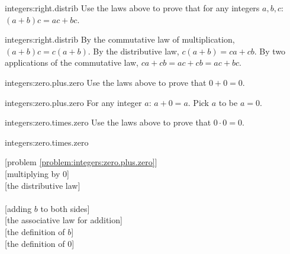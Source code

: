 \begin{problem}{integers:right.distrib}
Use the laws above to prove that for any integers \(a, b, c\): \((a+b)c=ac+bc\).
\end{problem}
\begin{answer}{integers:right.distrib}
By the commutative law of multiplication, \((a+b)c=c(a+b)\).
By the distributive law, \(c(a+b)=ca+cb\).
By two applications of the commutative law, \(ca+cb=ac+cb=ac+bc\).
\end{answer}

\begin{problem}{integers:zero.plus.zero}
Use the laws above to prove that \(0+0=0\).
\end{problem}
\begin{answer}{integers:zero.plus.zero}
For any integer \(a\): \(a+0=a\). Pick \(a\) to be \(a=0\).
\end{answer}

\begin{problem}{integers:zero.times.zero}
Use the laws above to prove that \(0 \cdot 0=0\).
\end{problem}
\begin{answer}{integers:zero.times.zero}
\begin{twocolumnproof}
[problem \ref{problem:integers:zero.plus.zero}] \\
[multiplying by \(0\)] \\
[the distributive law] \\
 \\
[adding \(b\) to both sides] \\
[the associative law for addition] \\
[the definition of \(b\)] \\
[the definition of \(0\)] \\
\end{twocolumnproof}
\end{answer}

